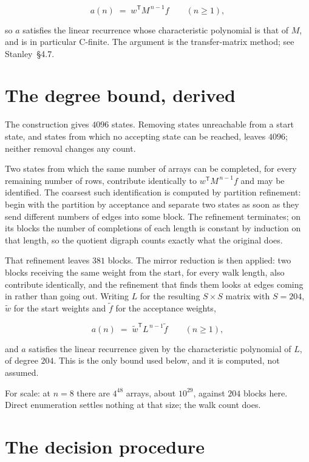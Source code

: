 \documentclass[11pt]{article}
\theoremstyle{definition}
\begin{document}
\[a(n) \;=\; w^{\mathsf T} M^{\,n-1} f \qquad (n \ge 1),\]

so $a$ satisfies the linear recurrence whose characteristic polynomial is that of $M$, and is in particular C-finite. The argument is the transfer-matrix method; see Stanley~\S4.7.

\section{The degree bound, derived}

The construction gives $4096$ states. Removing states unreachable from a start state, and states from which no accepting state can be reached, leaves $4096$; neither removal changes any count.

Two states from which the same number of arrays can be completed, for every remaining number of rows, contribute identically to $w^{\mathsf T}M^{\,n-1}f$ and may be identified. The coarsest such identification is computed by partition refinement: begin with the partition by acceptance and separate two states as soon as they send different numbers of edges into some block. The refinement terminates; on its blocks the number of completions of each length is constant by induction on that length, so the quotient digraph counts exactly what the original does.

That refinement leaves $381$ blocks. The mirror reduction is then applied: two blocks receiving the same weight from the start, for every walk length, also contribute identically, and the refinement that finds them looks at edges coming in rather than going out. Writing $L$ for the resulting $S \times S$ matrix with $S = 204$, $\tilde w$ for the start weights and $\tilde f$ for the acceptance weights,

\[a(n) \;=\; \tilde w^{\mathsf T} L^{\,n-1} \tilde f \qquad (n \ge 1),\]

and $a$ satisfies the linear recurrence given by the characteristic polynomial of $L$, of degree $204$. This is the only bound used below, and it is computed, not assumed.

For scale: at $n = 8$ there are $4^{48}$ arrays, about $10^{29}$, against $204$ blocks here. Direct enumeration settles nothing at that size; the walk count does.

\section{The decision procedure}
\end{document}
